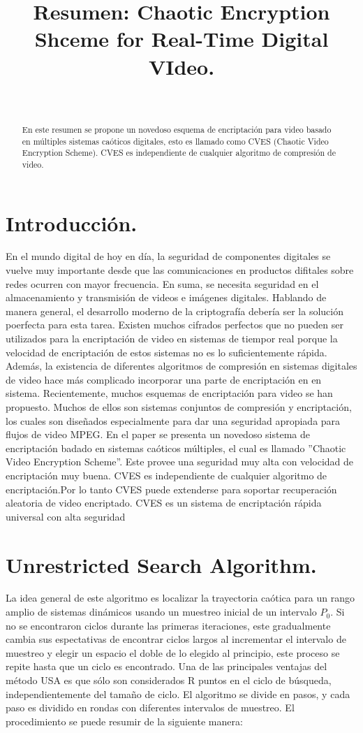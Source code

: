 \documentclass[10pt]{IEEEtran}
\title {Resumen: Chaotic Encryption Shceme for Real-Time Digital VIdeo.}
\author{\IEEEauthorblockN{Marcos Daniel Calderón Calderón}\\
\IEEEauthorblockA{Maestría en Ciencias de la Computación\\
Centro de Investigación en Matemáticas (CIMAT)\\
Guanajuato , Gto.\\
marcos.calderon@cimat.mx}}
\begin{document}
\maketitle
\begin{abstract}
En este resumen se propone un novedoso esquema de encriptación para video basado en múltiples sistemas caóticos digitales, esto es llamado como CVES (Chaotic Video Encryption Scheme). CVES es independiente de cualquier algoritmo de compresión de video.
\end{abstract}

\section{Introducción.}
En el mundo digital de hoy en día, la seguridad de componentes digitales se vuelve muy importante desde que las comunicaciones en productos difitales sobre redes ocurren con mayor frecuencia. En suma, se necesita seguridad en el almacenamiento y transmisión de videos e imágenes digitales. Hablando de manera general, el desarrollo moderno de la criptografía debería ser la solución poerfecta para esta tarea. Existen muchos cifrados perfectos que no pueden ser utilizados para la encriptación de video en sistemas de tiempor real porque la velocidad de encriptación de estos sistemas no es lo suficientemente rápida. Además, la existencia de diferentes algoritmos de compresión en sistemas digitales de video hace más complicado incorporar una parte de encriptación en en sistema.
Recientemente, muchos esquemas de encriptación para video se han propuesto. Muchos de ellos son sistemas conjuntos de compresión y encriptación, los cuales son diseñados especialmente para dar una seguridad apropiada para flujos de video MPEG.
En el paper se presenta un novedoso sistema de encriptación badado en sistemas caóticos múltiples, el cual es llamado ''Chaotic Video Encryption Scheme''. Este provee una seguridad muy alta con velocidad de encriptación muy buena. CVES es independiente de cualquier algoritmo de encriptación.Por lo tanto CVES puede extenderse para soportar recuperación aleatoria de video encriptado. CVES es un sistema de encriptación rápida universal  con alta seguridad 


\section{Unrestricted Search Algorithm.}
La idea general de este algoritmo es localizar la trayectoria caótica para un rango amplio de sistemas dinámicos usando un muestreo inicial de un intervalo $P_{0}$. Si no se encontraron ciclos durante las primeras iteraciones, este gradualmente cambia sus espectativas de encontrar ciclos largos al incrementar el intervalo de muestreo y elegir un espacio el doble de lo elegido al principio, este proceso se repite hasta que un ciclo es encontrado.  Una de las principales ventajas del método USA es que  sólo son considerados R puntos en el ciclo de búsqueda, independientemente del tamaño de ciclo. El algoritmo se divide en pasos, y cada paso es dividido en rondas con diferentes intervalos de muestreo. El procedimiento se puede resumir de la siguiente manera:
\end{document}
